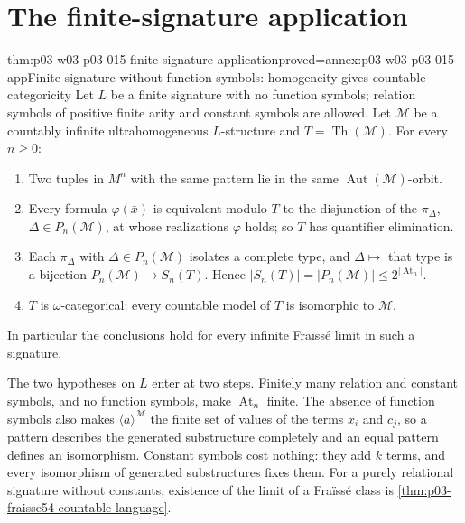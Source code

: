 \section{The finite-signature application}
\label{sec:p03-w03-p03-015-application}

\begin{hbtheorem}{thm:p03-w03-p03-015-finite-signature-application}{proved=annex:p03-w03-p03-015-app}{Finite signature without function symbols: homogeneity gives countable categoricity}
Let \(L\) be a finite signature with no function symbols; relation
symbols of positive finite arity and constant symbols are allowed. Let \(\mathcal M\) be a countably infinite
ultrahomogeneous \(L\)-structure and \(T=\operatorname{Th}(\mathcal M)\).
For every \(n\geq0\):
\begin{enumerate}
\item Two tuples in \(M^n\) with the same pattern lie in the same
      \(\operatorname{Aut}(\mathcal M)\)-orbit.
\item Every formula \(\varphi(\bar x)\) is equivalent modulo \(T\) to
      the disjunction of the \(\pi_\Delta\), \(\Delta\in P_n(\mathcal M)\),
      at whose realizations \(\varphi\) holds; so \(T\) has quantifier
      elimination.
\item Each \(\pi_\Delta\) with \(\Delta\in P_n(\mathcal M)\) isolates a
      complete type, and \(\Delta\mapsto\) that type is a bijection
      \(P_n(\mathcal M)\to S_n(T)\). Hence
      \(|S_n(T)|=|P_n(\mathcal M)|\leq2^{|\operatorname{At}_n|}\).
\item \(T\) is \(\omega\)-categorical: every countable model of \(T\) is
      isomorphic to \(\mathcal M\).
\end{enumerate}
In particular the conclusions hold for every infinite Fra\"iss\'e limit
in such a signature.
\end{hbtheorem}

The two hypotheses on \(L\) enter at two steps. Finitely many relation and
constant symbols, and no function symbols, make \(\operatorname{At}_n\)
finite. The absence of function symbols also makes
\(\langle\bar a\rangle^{\mathcal M}\) the finite set of values of the
terms \(x_i\) and \(c_j\), so a pattern describes the generated
substructure completely and an equal pattern defines an isomorphism.
Constant symbols cost nothing: they add \(k\) terms, and every isomorphism
of generated substructures fixes them. For a purely relational signature
without constants, existence of the limit of a Fra\"iss\'e class is
\cref{thm:p03-fraisse54-countable-language}.

